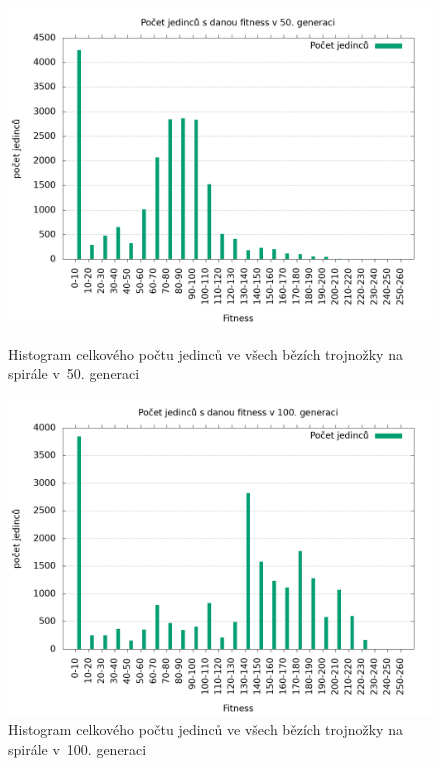 \begin{figure}[h]
    \begin{minipage}[c]{0.48\linewidth}
        \includegraphics[width=\linewidth]{obrazky/trojnozka_spirala_fitnessHistogram50.png}
        \caption{Histogram celkového počtu jedinců ve všech bězích trojnožky na spirále v~50. generaci}
        \label{fig:trojnozka_spirala_histogram_50}
    \end{minipage}
    \hfill
    \begin{minipage}[c]{0.48\linewidth}
        \includegraphics[width=\linewidth]{obrazky/trojnozka_spirala_fitnessHistogram100.png}
        \caption{Histogram celkového počtu jedinců ve všech bězích trojnožky na spirále v~100. generaci}
        \label{fig:trojnozka_spirala_histogram_100}
    \end{minipage}
\end{figure}

